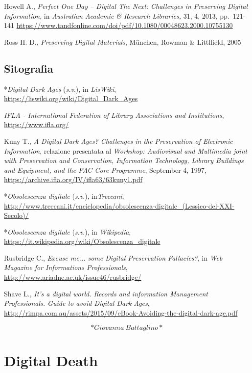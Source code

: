\documentclass[
  b5paper,
  twoside,
  12pt,
  chapterprefix=false,
  bibliography=totocnumbered,
  parskip=false]{scrbook}
\begin{document}
Howell A., \emph{Perfect One Day -- Digital The Next: Challenges in
Preserving Digital Information}, in \emph{Australian Academic \& Research
Libraries,} 31, 4, 2013, pp.~121-141
\url{https://www.tandfonline.com/doi/pdf/10.1080/00048623.2000.10755130}

Ross H. D., \emph{Preserving Digital Materials}, München, Rowman \&
Littlfield, 2005

\hypertarget{sitografia-8}{%
\section*{Sitografia}\label{sitografia-8}}

*\emph{Digital Dark Ages} (\emph{s.v}.), in \emph{LisWiki},
\url{https://liswiki.org/wiki/Digital_Dark_Ages}

\emph{IFLA - International Federation of Library Associations and
Institutions},
\url{https://www.ifla.org/}

Kuny T., \emph{A Digital Dark Ages? Challenges in the Preservation of
Electronic Information}, relazione presentata al \emph{Workshop: Audiovisual
and Multimedia joint with Preservation and Conservation, Information
Technology, Library Buildings and Equipment, and the PAC Core
Programme}, September 4, 1997,
\url{https://archive.ifla.org/IV/ifla63/63kuny1.pdf}

*\emph{Obsolescenza digitale} (\emph{s.v}.), in\emph{Treccani},
\url{http://www.treccani.it/enciclopedia/obsolescenza-digitale_(Lessico-del-XXI-Secolo)/}

*\emph{Obsolescenza digitale} (\emph{s.v}.), in \emph{Wikipedia},
\url{https://it.wikipedia.org/wiki/Obsolescenza_digitale}

Rusbridge C., \emph{Excuse me... some Digital Preservation Fallacies?}, in
\emph{Web Magazine for Informations Professionals},
\url{http://www.ariadne.ac.uk/issue46/rusbridge/}

Shave L., \emph{It's a digital world. Records and information Management
Professionals. Guide to avoid Digital Dark Ages},
\url{http://rimpa.com.au/assets/2015/09/eBook-Avoiding-the-digital-dark-age.pdf}

\[*Giovanna~Battaglino*\]

\hypertarget{digital-death}{%
\chapter{Digital Death}\label{digital-death}}
\end{document}

